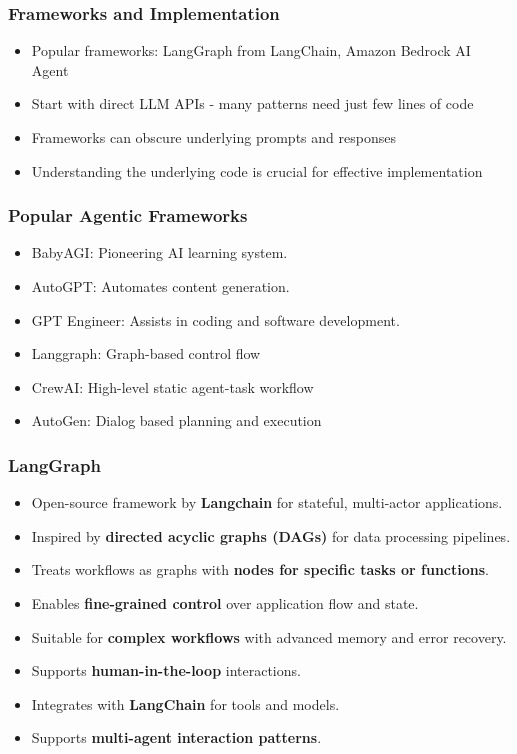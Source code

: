 \begin{frame}[fragile]\frametitle{Frameworks and Implementation}
    \begin{itemize}
        \item Popular frameworks: LangGraph from LangChain, Amazon Bedrock AI Agent
        \item Start with direct LLM APIs - many patterns need just few lines of code
        \item Frameworks can obscure underlying prompts and responses
        \item Understanding the underlying code is crucial for effective implementation
    \end{itemize}
\end{frame}


\begin{frame}[fragile]\frametitle{Popular Agentic Frameworks}

  \begin{itemize}
    \item BabyAGI: Pioneering AI learning system.
    \item AutoGPT: Automates content generation.
    \item GPT Engineer: Assists in coding and software development.
	\item Langgraph: Graph-based control flow
	\item CrewAI: High-level static agent-task workflow
    \item AutoGen: Dialog based planning and execution
  \end{itemize}
\end{frame}

\begin{frame}[fragile]\frametitle{LangGraph}
\begin{itemize}
    \item Open-source framework by \textbf{Langchain} for stateful, multi-actor applications.
    \item Inspired by \textbf{directed acyclic graphs (DAGs)} for data processing pipelines.
    \item Treats workflows as graphs with \textbf{nodes for specific tasks or functions}.
    \item Enables \textbf{fine-grained control} over application flow and state.
    \item Suitable for \textbf{complex workflows} with advanced memory and error recovery.
    \item Supports \textbf{human-in-the-loop} interactions.
    \item Integrates with \textbf{LangChain} for tools and models.
    \item Supports \textbf{multi-agent interaction patterns}.
\end{itemize}
\end{frame}

